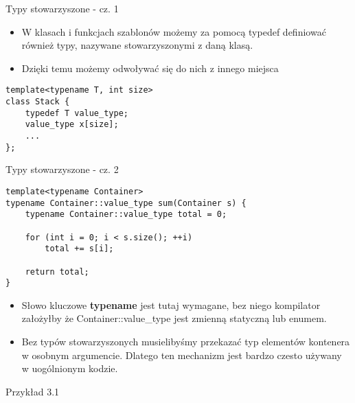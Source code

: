 \documentclass[11pt]{beamer}
\begin{document}
\begin{frame}[fragile]{Typy stowarzyszone - cz. 1}
    \begin{itemize}
        \item W klasach i funkcjach szablonów możemy za pomocą typedef definiować również typy, nazywane stowarzyszonymi z daną klasą.
        \item Dzięki temu możemy odwoływać się do nich z innego miejsca
    \end{itemize}
    \begin{lstlisting}[frame=single]
template<typename T, int size>
class Stack {
    typedef T value_type;
    value_type x[size];
    ...
};
    \end{lstlisting}
\end{frame}

\begin{frame}[fragile]{Typy stowarzyszone - cz. 2}
    \begin{lstlisting}[frame=single,basicstyle=\small]
template<typename Container>
typename Container::value_type sum(Container s) {
    typename Container::value_type total = 0;
    
    for (int i = 0; i < s.size(); ++i)
        total += s[i];

    return total;
}
    \end{lstlisting}
    \begin{itemize}
        \item Słowo kluczowe \textbf{typename} jest tutaj wymagane, bez niego kompilator założyłby że Container::value\_type jest zmienną statyczną lub enumem.
        \item Bez typów stowarzyszonych musielibyśmy przekazać typ elementów kontenera w osobnym argumencie. Dlatego ten mechanizm jest bardzo czesto używany w uogólnionym kodzie.
    \end{itemize}
    \alert{Przykład 3.1} 
\end{frame}
\end{document}
